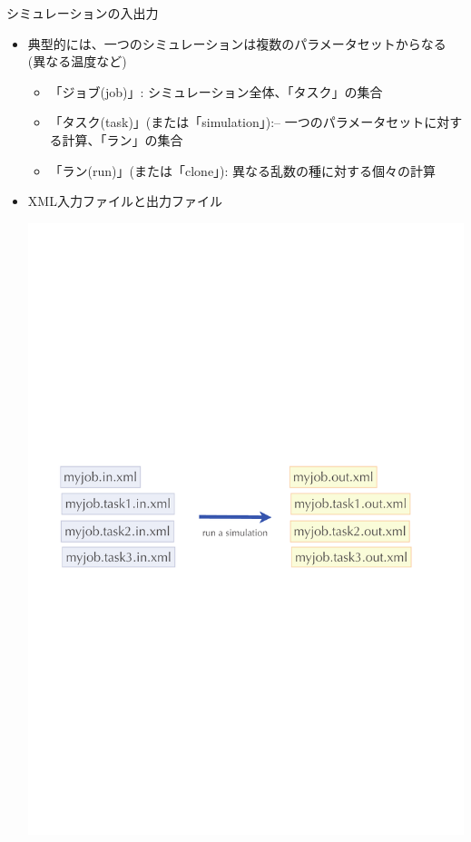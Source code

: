 \begin{frame}{シミュレーションの入出力}
  \begin{itemize}
  \item 典型的には、一つのシミュレーションは複数のパラメータセットからなる \\ (異なる温度など)
    \begin{itemize}
    \item 「ジョブ(job)」: シミュレーション全体、「タスク」の集合
    \item 「タスク(task)」(または「simulation」):– 一つのパラメータセットに対する計算、「ラン」の集合
    \item 「ラン(run)」(または「clone」): 異なる乱数の種に対する個々の計算
    \end{itemize}
  \item XML入力ファイルと出力ファイル
  \begin{center}
    \includegraphics[width=.55\textwidth]{simulation1.pdf}
  \end{center}
  \end{itemize}
\end{frame}

